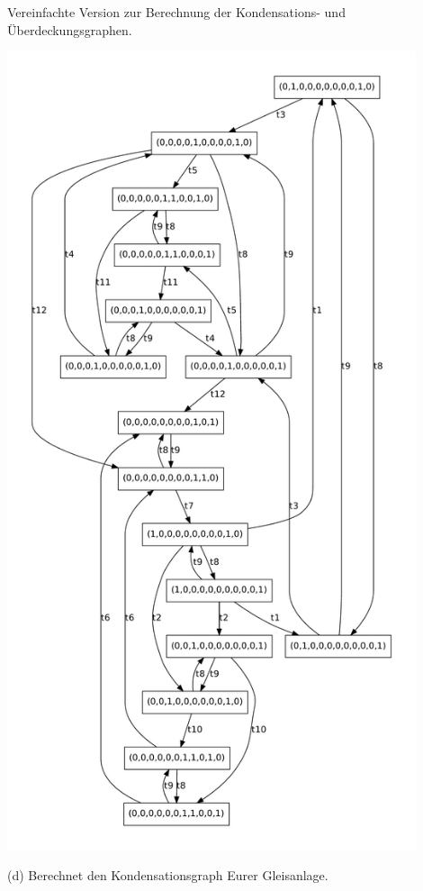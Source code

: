 \documentclass{scrreprt}
\begin{document}
\begin{enumerate}
Vereinfachte Version zur Berechnung der Kondensations- und Überdeckungsgraphen.

\includegraphics[width=0.9\textwidth]{eg_easy.pdf}

(d) Berechnet den Kondensationsgraph Eurer Gleisanlage.


\end{enumerate}
\end{document}

